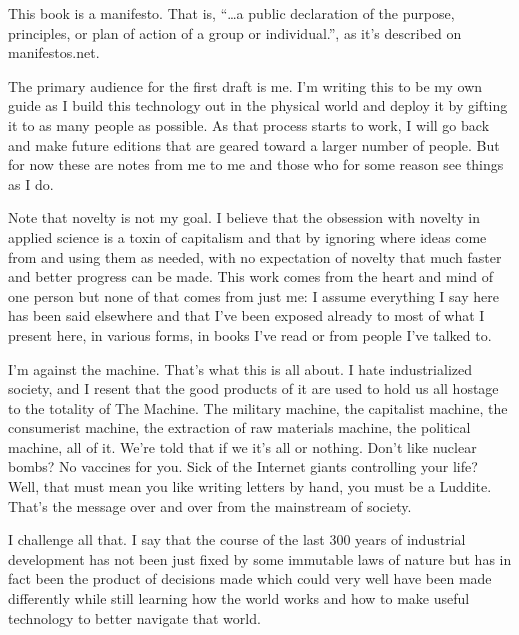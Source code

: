 This book is a manifesto. That is, ``\ldots{}a public declaration of the
purpose, principles, or plan of action of a group or individual.'', as
it's described on manifestos.net.

The primary audience for the first draft is me. I'm writing this to be
my own guide as I build this technology out in the physical world and
deploy it by gifting it to as many people as possible. As that process
starts to work, I will go back and make future editions that are geared
toward a larger number of people. But for now these are notes from me to
me and those who for some reason see things as I do.

Note that novelty is not my goal. I believe that the obsession with
novelty in applied science is a toxin of capitalism and that by ignoring
where ideas come from and using them as needed, with no expectation of
novelty that much faster and better progress can be made. This work
comes from the heart and mind of one person but none of that comes from
just me: I assume everything I say here has been said elsewhere and that
I've been exposed already to most of what I present here, in various
forms, in books I've read or from people I've talked to.

I'm against the machine. That's what this is all about. I hate
industrialized society, and I resent that the good products of it are
used to hold us all hostage to the totality of The Machine. The military
machine, the capitalist machine, the consumerist machine, the extraction
of raw materials machine, the political machine, all of it. We're told
that if we it's all or nothing. Don't like nuclear bombs? No vaccines
for you. Sick of the Internet giants controlling your life? Well, that
must mean you like writing letters by hand, you must be a Luddite.
That's the message over and over from the mainstream of society.

I challenge all that. I say that the course of the last 300 years of
industrial development has not been just fixed by some immutable laws of
nature but has in fact been the product of decisions made which could
very well have been made differently while still learning how the world
works and how to make useful technology to better navigate that world.
